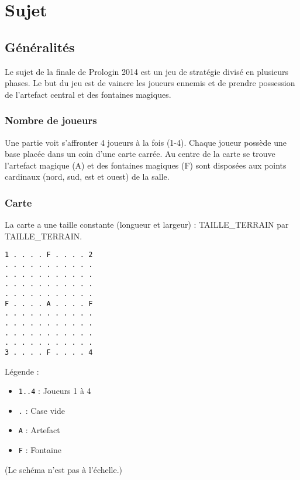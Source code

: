 \section{Sujet}\label{finale-prologin-2014-sujet}

\subsection{Généralités}\label{introduction}

Le sujet de la finale de Prologin 2014 est un jeu de stratégie divisé en
plusieurs phases. Le but du jeu est de vaincre les joueurs ennemis et de
prendre possession de l'artefact central et des fontaines magiques.

\subsubsection{Nombre de joueurs}\label{nombre-de-joueurs}

Une partie voit s'affronter 4 joueurs à la fois (1-4). Chaque joueur
possède une base placée dans un coin d'une carte carrée.
Au centre de la carte se trouve l'artefact magique (A) et des
fontaines magiques (F) sont disposées aux points cardinaux (nord, sud, est et ouest) de la
salle.

\subsubsection{Carte}\label{carte}

La carte a une taille constante (longueur et largeur) : TAILLE\_TERRAIN
par TAILLE\_TERRAIN.

\begin{multicols}{2}
\begin{verbatim}
1 . . . . F . . . . 2
. . . . . . . . . . .
. . . . . . . . . . .
. . . . . . . . . . .
. . . . . . . . . . .
F . . . . A . . . . F
. . . . . . . . . . .
. . . . . . . . . . .
. . . . . . . . . . .
. . . . . . . . . . .
3 . . . . F . . . . 4
\end{verbatim}
\columnbreak
Légende :

\begin{itemize}
\itemsep1pt\parskip0pt
\item
  \texttt{1..4} : Joueurs 1 à 4
\item
  \texttt{.} : Case vide
\item
  \texttt{A} : Artefact
\item
  \texttt{F} : Fontaine
\end{itemize}

\noindent
(Le schéma n'est pas à l'échelle.)

\end{multicols}

